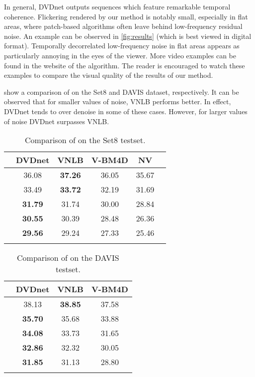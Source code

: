 \documentclass{article}
\begin{document}
	In general, DVDnet outputs sequences which feature remarkable temporal coherence. Flickering rendered by our method is notably small, especially in flat areas, where patch-based algorithms often leave behind low-frequency residual noise. An example can be observed in \cref{fig:results} (which is best viewed in digital format). Temporally decorrelated low-frequency noise in flat areas appears as particularly annoying in the eyes of the viewer. More video examples can be found in the website of the algorithm. The reader is encouraged to watch these examples to compare the visual quality of the results of our method.
	
	 show a comparison of  on the Set8 and DAVIS dataset, respectively. It can be observed that for smaller values of noise, VNLB performs better. In effect, DVDnet tends to over denoise in some of these cases. However, for larger values of noise DVDnet surpasses VNLB.
\begin{table}[!htbp]
\centering	
		\caption{\label{tbl:results-set8}Comparison of  on the Set8 testset.}		
			\begin{tabular}[b]{@{}l c c c c@{}l}
				\toprule[0.8pt]
				  & DVDnet & VNLB & V-BM4D & NV \\ 
				\midrule[0.8pt]
				 & 36.08 & \textbf{37.26} & 36.05 & 35.67 \\ 
				 & 33.49 & \textbf{33.72} & 32.19 & 31.69 \\ 
				 & \textbf{31.79} & 31.74 & 30.00 & 28.84 \\ 
				 & \textbf{30.55} & 30.39 & 28.48 & 26.36 \\ 
				 & \textbf{29.56} & 29.24 & 27.33 & 25.46 \\ 
				\bottomrule[0.8pt]& 
			\end{tabular}
\end{table}
\begin{table}[!htbp]
\centering
		\caption{\label{tbl:results-davis}Comparison of  on the DAVIS testset.}	
			\begin{tabular}[b]{@{}l c c c}
				\toprule[0.8pt]
				  & DVDnet & VNLB & V-BM4D \\ 
				\midrule[0.8pt]
				
				 & 38.13 & \textbf{38.85} & 37.58 \\ 
				 & \textbf{35.70} & 35.68 & 33.88 \\ 
				 & \textbf{34.08} & 33.73 & 31.65 \\ 
				 & \textbf{32.86} & 32.32 & 30.05 \\ 
				 & \textbf{31.85} & 31.13 & 28.80 \\ 

				\bottomrule[0.8pt]& 
			\end{tabular}
\end{table}
\end{document}
